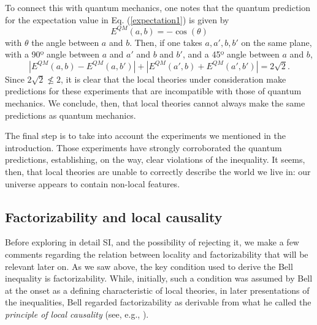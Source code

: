 \documentclass[letterpaper,12pt]{article}
\begin{document}
To connect this with quantum mechanics, one notes that the quantum prediction for the expectation value in Eq. (\ref{expectation1}) is given by 
\begin{equation}
E^{QM}(a,b) = -\cos(\theta)
\end{equation}
with $\theta$ the angle between $a$ and $b$. Then, if one takes $a,a',b,b'$ on the same plane, with a 90º angle between $a$ and $a'$ and $b$ and $b'$, and a 45º angle between $a$ and $b$,
\begin{equation}\label{qprediction}
|E^{QM}(a,b) - E^{QM}(a,b')| + |E^{QM}(a',b) + E^{QM}(a',b')| = 2\sqrt{2}.
\end{equation}
Since $2\sqrt{2} \nleq 2$, it is clear that the local theories under consideration make predictions for these experiments that are incompatible with those of quantum mechanics. We conclude, then, that local theories cannot always make the same predictions as quantum mechanics.

The final step is to take into account the experiments we mentioned in the introduction. Those experiments have strongly corroborated the quantum predictions, establishing, on the way, clear violations of the inequality. It seems, then, that local theories are unable to correctly describe the world we live in: our universe appears to contain non-local features.

\subsection{Factorizability and local causality}
\label{facloc}
Before exploring in detail SI, and the possibility of rejecting it, we make a few comments regarding the relation between locality and factorizability that will be relevant later on. As we saw above, the key condition used to derive the Bell inequality is factorizability. While, initially, such a condition was assumed by Bell at the onset as a defining characteristic of local theories, in later presentations of the inequalities, Bell regarded factorizability as derivable from what he called the \emph{principle of local causality} (see, e.g., \cite{Bell1990}).
\end{document}
